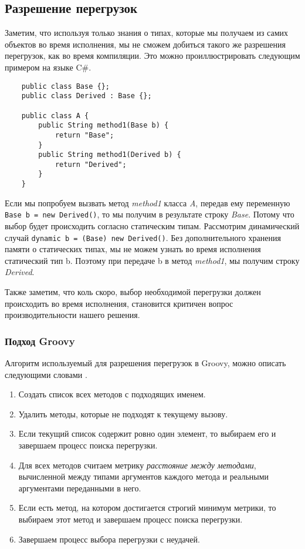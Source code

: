 \subsection{Разрешение перегрузок}

Заметим, что используя только знания о типах, которые мы получаем из самих объектов во время исполнения, мы не сможем добиться такого же разрешения перегрузок, как во время компиляции. Это можно проиллюстрировать следующим примером на языке C{\#}.

\begin{verbatim}
    public class Base {};
    public class Derived : Base {};
    
    public class A {
        public String method1(Base b) {
            return "Base";
        }
        public String method1(Derived b) {
            return "Derived";
        }
    }
\end{verbatim}

Если мы попробуем вызвать метод \textit{method1} класса \textit{A}, передав ему переменную  \texttt{Base b = new Derived()}, то мы получим в результате строку \textit{Base}. Потому что выбор будет происходить согласно статическим типам. Рассмотрим динамический случай \texttt{dynamic b = (Base) new Derived()}.
Без дополнительного хранения памяти о статических типах, мы не можем узнать во время исполнения статический тип b. Поэтому при передаче b в метод \textit{method1}, мы получим строку \textit{Derived}.

Также заметим, что коль скоро, выбор необходимой перегрузки должен происходить во время исполнения, становится критичен вопрос производительности нашего решения.

\subsubsection{Подход Groovy}

Алгоритм используемый для разрешения перегрузок в Groovy, можно описать следующими словами \cite{groovy:selectingOverloadsAtRuntime}.

\begin{enumerate}
    \item Создать список всех методов с подходящих именем.
    \item Удалить методы, которые не подходят к текущему вызову.
    \item Если текущий список содержит ровно один элемент, то выбираем его и завершаем процесс поиска перегрузки.
    \item Для всех методов считаем метрику \textit{расстояние между методами}, вычисленной между типами аргументов каждого метода и реальными аргументами переданными в него.
    \item Если есть метод, на котором достигается строгий минимум метрики, то выбираем этот метод и завершаем процесс поиска перегрузки.
    \item Завершаем процесс выбора перегрузки с неудачей.
\end{enumerate}

